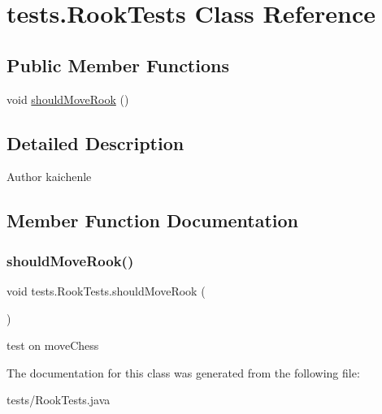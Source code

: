 \hypertarget{classtests_1_1_rook_tests}{}\section{tests.\+Rook\+Tests Class Reference}
\label{classtests_1_1_rook_tests}
\subsection*{Public Member Functions}
\begin{DoxyCompactItemize}
\item 
void \mbox{\hyperlink{classtests_1_1_rook_tests_a0c22f41e6a959108015b6d6a17adebef}{should\+Move\+Rook}} ()
\end{DoxyCompactItemize}


\subsection{Detailed Description}
\begin{DoxyAuthor}{Author}
kaichenle 
\end{DoxyAuthor}


\subsection{Member Function Documentation}
\mbox{\label{classtests_1_1_rook_tests_a0c22f41e6a959108015b6d6a17adebef}} 
\subsubsection{\texorpdfstring{should\+Move\+Rook()}{shouldMoveRook()}}
{\footnotesize\ttfamily void tests.\+Rook\+Tests.\+should\+Move\+Rook (\begin{DoxyParamCaption}{ }\end{DoxyParamCaption})\hspace{0.3cm}{\ttfamily [inline]}}

test on move\+Chess 

The documentation for this class was generated from the following file\+:\begin{DoxyCompactItemize}
\item 
tests/Rook\+Tests.\+java\end{DoxyCompactItemize}
